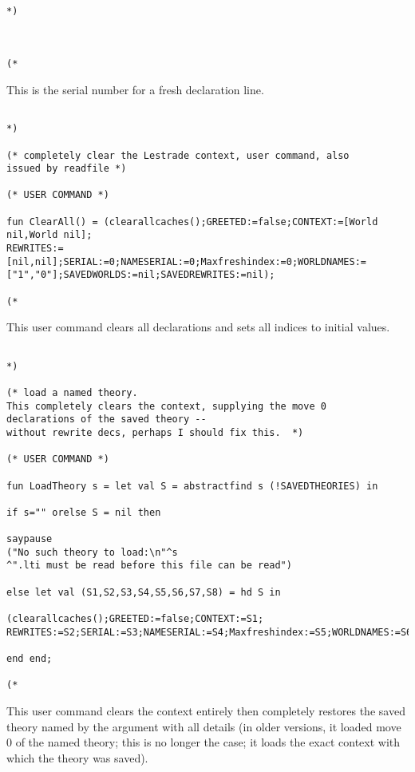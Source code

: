 \documentclass{article}
\begin{document}
\begin{verbatim}

*)



(*

\end{verbatim}

This is the serial number for a fresh declaration line.

\begin{verbatim}

*)

(* completely clear the Lestrade context, user command, also
issued by readfile *)

(* USER COMMAND *)

fun ClearAll() = (clearallcaches();GREETED:=false;CONTEXT:=[World nil,World nil];
REWRITES:=[nil,nil];SERIAL:=0;NAMESERIAL:=0;Maxfreshindex:=0;WORLDNAMES:=["1","0"];SAVEDWORLDS:=nil;SAVEDREWRITES:=nil);

(*

\end{verbatim}

This user command clears all declarations and sets all indices to initial values.

\begin{verbatim}

*)

(* load a named theory.  
This completely clears the context, supplying the move 0
declarations of the saved theory -- 
without rewrite decs, perhaps I should fix this.  *)

(* USER COMMAND *)

fun LoadTheory s = let val S = abstractfind s (!SAVEDTHEORIES) in

if s="" orelse S = nil then

saypause 
("No such theory to load:\n"^s
^".lti must be read before this file can be read")

else let val (S1,S2,S3,S4,S5,S6,S7,S8) = hd S in

(clearallcaches();GREETED:=false;CONTEXT:=S1;
REWRITES:=S2;SERIAL:=S3;NAMESERIAL:=S4;Maxfreshindex:=S5;WORLDNAMES:=S6;SAVEDWORLDS:=S7;SAVEDREWRITES:=S8)

end end;

(*

\end{verbatim}

This user command clears the context entirely then completely restores the saved theory named by the argument with all details (in older versions, it loaded move
0 of the named theory;  this is no longer the case;  it loads the exact context with which the theory was saved).
\end{document}
